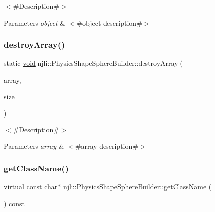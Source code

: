 $<$\#\+Description\#$>$


\begin{DoxyParams}{Parameters}
{\em object} & $<$\#object description\#$>$ \\
\hline
\end{DoxyParams}
\mbox{\label{classnjli_1_1_physics_shape_sphere_builder_ac529063dd27a995a69caed14399c09d8}} 
\subsubsection{\texorpdfstring{destroy\+Array()}{destroyArray()}}
{\footnotesize\ttfamily static \mbox{\hyperlink{_thread_8h_af1e856da2e658414cb2456cb6f7ebc66}{void}} njli\+::\+Physics\+Shape\+Sphere\+Builder\+::destroy\+Array (\begin{DoxyParamCaption}\item[{\mbox{\hyperlink{classnjli_1_1_physics_shape_sphere_builder}{Physics\+Shape\+Sphere\+Builder}} $\ast$$\ast$}]{array,  }\item[{const \mbox{\hyperlink{_util_8h_a10e94b422ef0c20dcdec20d31a1f5049}{u32}}}]{size = {} }\end{DoxyParamCaption})\hspace{0.3cm}{\ttfamily [static]}}

$<$\#\+Description\#$>$


\begin{DoxyParams}{Parameters}
{\em array} & $<$\#array description\#$>$ \\
\hline
\end{DoxyParams}
\mbox{\label{classnjli_1_1_physics_shape_sphere_builder_aacdedd9e2d89ab504d5540d9cd6fdfad}} 
\subsubsection{\texorpdfstring{get\+Class\+Name()}{getClassName()}}
{\footnotesize\ttfamily virtual const char$\ast$ njli\+::\+Physics\+Shape\+Sphere\+Builder\+::get\+Class\+Name (\begin{DoxyParamCaption}{ }\end{DoxyParamCaption}) const\hspace{0.3cm}{\ttfamily [virtual]}}

